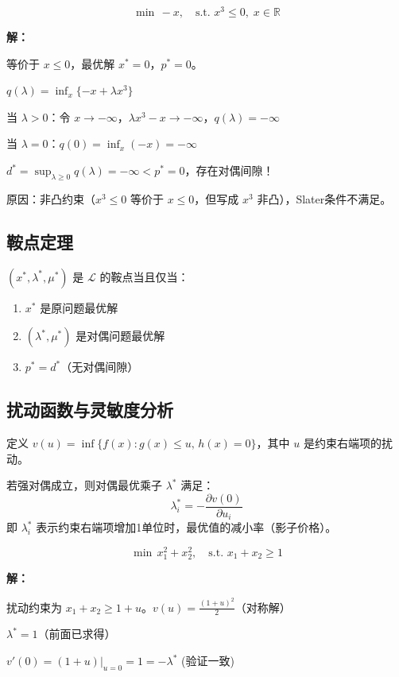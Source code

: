 \begin{example}[存在对偶间隙]
\[
\min \, -x, \quad \text{s.t. } x^3 \leq 0, \; x \in \mathbb{R}
\]

\textbf{解：}

等价于 $x \leq 0$，最优解 $x^* = 0$，$p^* = 0$。

$q(\lambda) = \inf_x \{-x + \lambda x^3\}$

当 $\lambda > 0$：令 $x \to -\infty$，$\lambda x^3 - x \to -\infty$，$q(\lambda) = -\infty$

当 $\lambda = 0$：$q(0) = \inf_x (-x) = -\infty$

$d^* = \sup_{\lambda \geq 0} q(\lambda) = -\infty < p^* = 0$，存在对偶间隙！

原因：非凸约束（$x^3 \leq 0$ 等价于 $x \leq 0$，但写成 $x^3$ 非凸），Slater条件不满足。
\end{example}

\subsection{鞍点定理}

\begin{theorem}[鞍点定理]
$(x^*, \lambda^*, \mu^*)$ 是 $\mathcal{L}$ 的鞍点当且仅当：
\begin{enumerate}
    \item $x^*$ 是原问题最优解
    \item $(\lambda^*, \mu^*)$ 是对偶问题最优解
    \item $p^* = d^*$（无对偶间隙）
\end{enumerate}
\end{theorem}

\subsection{扰动函数与灵敏度分析}

\begin{definition}[扰动函数]
定义 $v(u) = \inf\{f(x) : g(x) \leq u, \, h(x) = 0\}$，其中 $u$ 是约束右端项的扰动。
\end{definition}

\begin{theorem}[灵敏度分析]
若强对偶成立，则对偶最优乘子 $\lambda^*$ 满足：
\[
\lambda_i^* = -\frac{\partial v(0)}{\partial u_i}
\]
即 $\lambda_i^*$ 表示约束右端项增加1单位时，最优值的减小率（影子价格）。
\end{theorem}

\begin{example}[灵敏度分析]
\[
\min \, x_1^2 + x_2^2, \quad \text{s.t. } x_1 + x_2 \geq 1
\]

\textbf{解：}

扰动约束为 $x_1 + x_2 \geq 1 + u$。$v(u) = \frac{(1+u)^2}{2}$（对称解）

$\lambda^* = 1$（前面已求得）

$v'(0) = (1+u)|_{u=0} = 1 = -\lambda^*$ (验证一致)
\end{example}


